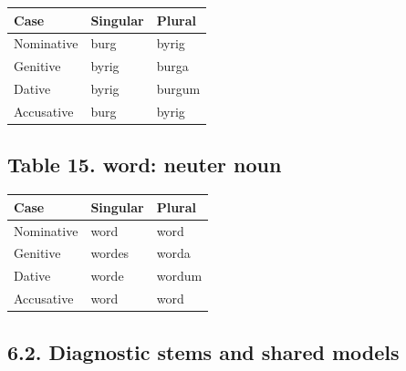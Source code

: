 \par\begingroup
\fontsize{10.5}{13.2}\selectfont
\setlength{\LTleft}{0pt}\setlength{\LTright}{\fill}
\noindent
\begin{tabular}{@{}>{\raggedright\arraybackslash}p{39.46mm}>{\raggedright\arraybackslash}p{39.46mm}>{\raggedright\arraybackslash}p{39.46mm}@{}}
\toprule
\textbf{Case} & \textbf{Singular} & \textbf{Plural} \\
\midrule
Nominative & burg & byrig \\
Genitive & byrig & burga \\
Dative & byrig & burgum \\
Accusative & burg & byrig \\
\bottomrule
\end{tabular}
\par\endgroup

\subsection*{Table 15. word: neuter noun}

\par\begingroup
\fontsize{10.5}{13.2}\selectfont
\setlength{\LTleft}{0pt}\setlength{\LTright}{\fill}
\noindent
\begin{tabular}{@{}>{\raggedright\arraybackslash}p{39.46mm}>{\raggedright\arraybackslash}p{39.46mm}>{\raggedright\arraybackslash}p{39.46mm}@{}}
\toprule
\textbf{Case} & \textbf{Singular} & \textbf{Plural} \\
\midrule
Nominative & word & word \\
Genitive & wordes & worda \\
Dative & worde & wordum \\
Accusative & word & word \\
\bottomrule
\end{tabular}
\par\endgroup

\subsection*{6.2. Diagnostic stems and shared models}

